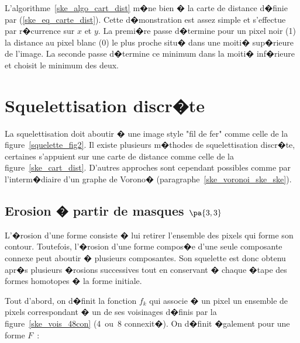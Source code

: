 L'algorithme~\ref{ske_algo_cart_dist} m�ne bien � la carte de distance d�finie par (\ref{ske_eq_carte_dist}). Cette d�monstration est assez simple et s'effectue par r�currence sur $x$ et $y$. La premi�re passe d�termine pour un pixel noir (1) la distance au pixel blanc (0) le plus proche situ� dans une moiti� sup�rieure de l'image. La seconde passe d�termine ce minimum dans la moiti� inf�rieure et choisit le minimum des deux.







\section{Squelettisation discr�te}


La squelettisation doit aboutir � une image style "fil de fer" comme celle de la figure~\ref{squelette_fig2}. Il existe plusieurs m�thodes de squelettisation discr�te, certaines s'appuient sur une carte de distance comme celle de la figure~\ref{ske_cart_dist}. D'autres approches sont cependant possibles comme par l'interm�diaire d'un graphe de Vorono� (paragraphe~\ref{ske_voronoi_ske_ske}). 











\subsection{Erosion � partir de masques $\pa{3,3}$}
\label{ske_par_erosion}



L'�rosion d'une forme consiste � lui retirer l'ensemble des pixels qui forme son contour. Toutefois, l'�rosion d'une forme compos�e d'une seule composante connexe peut aboutir � plusieurs composantes. Son squelette est donc obtenu apr�s plusieurs �rosions successives tout en conservant � chaque �tape des formes homotopes � la forme initiale.

Tout d'abord, on d�finit la fonction $f_k$ qui associe � un pixel un ensemble de pixels correspondant � un de ses voisinages d�finis par la figure~\ref{ske_vois_48con} (4~ou~8 connexit�). On d�finit �galement pour une forme $F$~:


